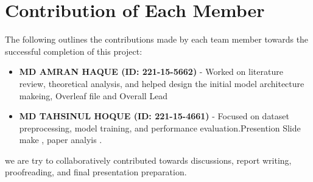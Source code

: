 \chapter*{Contribution of Each Member}

The following outlines the contributions made by each team member towards the successful completion of this project:

\begin{itemize}
    \item \textbf{ MD AMRAN HAQUE (ID: 221-15-5662)} - Worked on literature review, theoretical analysis, and helped design the initial model architecture makeing, Overleaf file and Overall Lead
    \item \textbf{MD TAHSINUL HOQUE (ID: 221-15-4661)} - Focused on dataset preprocessing, model training, and performance evaluation.Presention Slide make , paper analyis .
  
\end{itemize}

we are try to  collaboratively contributed towards discussions, report writing, proofreading, and final presentation preparation.
